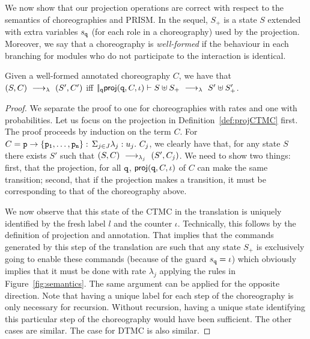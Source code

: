      We now show that our projection operations
    are correct with respect to the semantics of choreographies and
    PRISM. In the sequel, $S_+$ is a state $S$ extended with extra
    variables $s_{\mathtt{q}}$ (for each role in a choreography) used by
    the projection. Moreover, we say that a choreography is {\em
      well-formed} if the behaviour in each branching for modules who
    do not participate to the interaction is identical.
      \begin{theorem}[EPP]\label{thm:epp}
        Given a well-formed annotated choreography $C$, we have that
        $(S,C) \ \longrightarrow_{\lambda}\  (S', C')$ iff
        $|\!|_{\mathtt{q}}\mathsf{proj} (\mathtt{q}, C,\iota)\vdash S\uplus
        S_{+}\ \longrightarrow_{\lambda}\  S'\uplus S_{+}'$.
      \end{theorem} 
      \begin{proof} We separate the proof to one for choreographies
        with rates and one with probabilities. Let us focus on the
        projection in Definition~\ref{def:projCTMC} first. The proof
        proceeds by induction on the term $C$. For
        $C=\mathtt{p}\rightarrow \{\mathtt{\mathtt{p}_1,\ldots,\mathtt{p}_n}\}:\,\Sigma_{j\in J}\lambda_j: u_j.\ C_j$, we clearly have
        that, for any state $S$ there exists $S'$ such that
        $(S,C)\ \longrightarrow_{\lambda_j}\ (S',C_j)$. We need to show two things:
        first, that the projection, for all $\mathtt{q}$,
        $\mathsf{proj}{(\mathtt{q},C,\iota)}$ of $C$ can make the same
        transition; second, that if the projection makes a transition,
        it must be corresponding to that of the choreography above.

        We now observe that this state of the CTMC in the translation
        is uniquely identified by the fresh label $l$ and the counter
        $\iota$. Technically, this follows by the definition of
        projection and annotation. That implies that the commands
        generated by this step of the translation are such that any
        state $S_+$ is exclusively going to enable these commands
        (because of the guard $s_{\mathtt{q}}=\iota$) which obviously
        implies that it must be done with rate $\lambda_j$ applying
        the rules in Figure~\ref{fig:semantics}. The same argument can
        be applied for the opposite direction. Note that having a
        unique label for each step of the choreography is only
        necessary for recursion. Without recursion, having a unique
        state identifying this particular step of the choreography
        would have been sufficient. The other cases are similar. The
        case for DTMC is also similar.




\end{proof}
